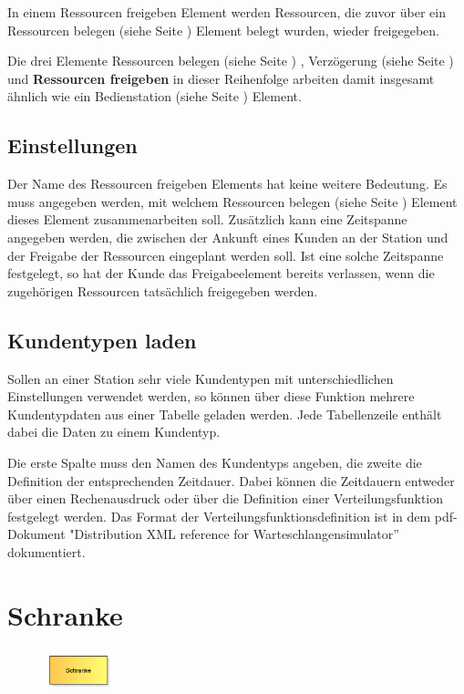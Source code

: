 In einem Ressourcen freigeben Element werden Ressourcen, die zuvor über ein Ressourcen belegen (siehe Seite \pageref{ref:ModelElementSeize}) 
Element belegt wurden, wieder freigegeben.

Die drei Elemente Ressourcen belegen (siehe Seite \pageref{ref:ModelElementSeize}) , Verzögerung (siehe Seite \pageref{ref:ModelElementDelay}) und
\textbf{Ressourcen freigeben} in dieser Reihenfolge arbeiten damit
insgesamt ähnlich wie ein Bedienstation (siehe Seite \pageref{ref:ModelElementProcess}) Element.

\subsection*{Einstellungen}

Der Name des Ressourcen freigeben Elements hat keine weitere Bedeutung. Es muss angegeben werden, mit welchem
Ressourcen belegen (siehe Seite \pageref{ref:ModelElementSeize}) Element dieses Element zusammenarbeiten soll.
Zusätzlich kann eine Zeitspanne angegeben werden, die zwischen der Ankunft eines Kunden an der Station und
der Freigabe der Ressourcen eingeplant werden soll. Ist eine solche Zeitspanne festgelegt, so hat der Kunde
das Freigabeelement bereits verlassen, wenn die zugehörigen Ressourcen tatsächlich freigegeben werden.  

\subsection*{Kundentypen laden}

Sollen an einer Station sehr viele Kundentypen mit unterschiedlichen Einstellungen verwendet werden, so können über diese Funktion mehrere Kundentypdaten aus einer Tabelle geladen werden. Jede Tabellenzeile enthält dabei die Daten zu einem Kundentyp.

Die erste Spalte muss den Namen des Kundentyps angeben, die zweite die Definition der entsprechenden Zeitdauer.
Dabei können die Zeitdauern entweder über einen Rechenausdruck oder über die Definition einer
Verteilungsfunktion festgelegt werden. Das Format der Verteilungsfunktionsdefinition ist in dem pdf-Dokument
"Distribution XML reference for Warteschlangensimulator'' dokumentiert.


\section{Schranke}
\label{ref:ModelElementBarrier}

\begin{figure}
\vspace{-22pt}
\includegraphics[width=2cm]{imageModelElementBarrier.png}
\vspace{-22pt}
\end{figure}

